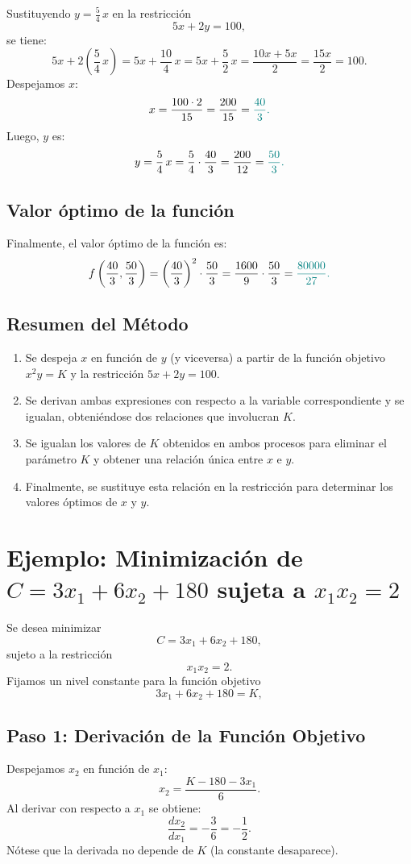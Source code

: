 \documentclass{article}
\begin{document}
Sustituyendo \(y=\frac{5}{4}\,x\) en la restricción
\[
5x+2y=100,
\]
se tiene:
\[
5x+2\left(\frac{5}{4}\,x\right)=5x+\frac{10}{4}\,x=5x+\frac{5}{2}\,x=\frac{10x+5x}{2}=\frac{15x}{2}=100.
\]
Despejamos \(x\):
\[
x=\frac{100\cdot 2}{15}=\frac{200}{15}=\color{teal}\frac{40}{3}.
\]
Luego, \(y\) es:
\[
y=\frac{5}{4}\,x=\frac{5}{4}\cdot\frac{40}{3}=\frac{200}{12}=\color{teal}\frac{50}{3}.
\]

\subsection*{Valor óptimo de la función}

Finalmente, el valor óptimo de la función es:
\[
f\left(\frac{40}{3},\frac{50}{3}\right)=\left(\frac{40}{3}\right)^2\cdot\frac{50}{3}=\frac{1600}{9}\cdot\frac{50}{3}=\color{teal}\frac{80000}{27}.
\]

\subsection*{Resumen del Método}

\begin{enumerate}
    \item Se despeja \(x\) en función de \(y\) (y viceversa) a partir de la función objetivo \(x^2y=K\) y la restricción \(5x+2y=100\).
    \item Se derivan ambas expresiones con respecto a la variable correspondiente y se igualan, obteniéndose dos relaciones que involucran \(K\).
    \item Se igualan los valores de \(K\) obtenidos en ambos procesos para eliminar el parámetro \(K\) y obtener una relación única entre \(x\) e \(y\).
    \item Finalmente, se sustituye esta relación en la restricción para determinar los valores óptimos de \(x\) y \(y\).
\end{enumerate}



\section*{Ejemplo: Minimización de \(C = 3x_1 + 6x_2 + 180\) sujeta a \(x_1 x_2 = 2\)}

Se desea minimizar
\[
C = 3x_1 + 6x_2 + 180,
\]
sujeto a la restricción
\[
x_1 x_2 = 2.
\]
Fijamos un nivel constante para la función objetivo
\[
3x_1 + 6x_2 +180 = K,
\]

\subsection*{Paso 1: Derivación de la Función Objetivo}
Despejamos \(x_2\) en función de \(x_1\):
\[
x_2 = \frac{K - 180 - 3x_1}{6}.
\]
Al derivar con respecto a \(x_1\) se obtiene:
\[
\frac{dx_2}{dx_1} = -\frac{3}{6} = -\frac{1}{2}.
\]
Nótese que la derivada no depende de \(K\) (la constante desaparece).
\end{document}
